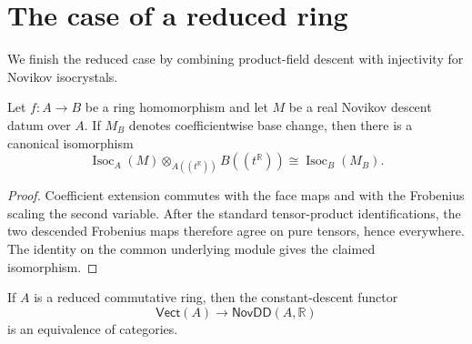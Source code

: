 \section{The case of a reduced ring}
\label{sec:reduced}

We finish the reduced case by combining product-field descent with injectivity
for Novikov isocrystals.

\begin{lemma}
  \label{lem:descent_isocrystal_base_change}
  \leanok
  Let $f\colon A\to B$ be a ring homomorphism and let $M$ be a real Novikov
  descent datum over $A$. If $M_B$ denotes coefficientwise base change, then
  there is a canonical isomorphism
  \[
    \operatorname{Isoc}_A(M)\otimes_{A((t^{\mathbb{R}}))}B((t^{\mathbb{R}}))
      \cong \operatorname{Isoc}_B(M_B).
  \]
\end{lemma}

\begin{proof}
  \leanok
  Coefficient extension commutes with the face maps and with the Frobenius
  scaling the second variable.  After the standard tensor-product
  identifications, the two descended Frobenius maps therefore agree on pure
  tensors, hence everywhere.  The identity on the common underlying module gives the
  claimed isomorphism.
\end{proof}

\begin{theorem}
  \label{thm:novikov_descent_equivalence_reduced}
  \leanok
  If $A$ is a reduced commutative ring, then the constant-descent functor
  \[
    \mathsf{Vect}(A)\longrightarrow\mathsf{NovDD}(A,\mathbb{R})
  \]
  is an equivalence of categories.
\end{theorem}

